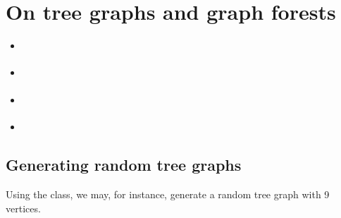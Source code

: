 \documentclass[a4paper,12pt,english]{sphinxhowto}
\begin{document}
\section{On tree graphs and graph forests}
\label{\detokenize{tutorial:on-tree-graphs-and-graph-forests}}\label{\detokenize{tutorial:trees-tutorial-label}}
\begin{sphinxShadowBox}
\begin{itemize}
\item {} 
\label{\detokenize{tutorial:id233}}{\hyperref[\detokenize{tutorial:generating-random-tree-graphs}]{}}

\item {} 
\label{\detokenize{tutorial:id234}}{\hyperref[\detokenize{tutorial:recognizing-tree-graphs}]{}}

\item {} 
\label{\detokenize{tutorial:id235}}{\hyperref[\detokenize{tutorial:spanning-trees-and-forests}]{}}

\item {} 
\label{\detokenize{tutorial:id236}}{\hyperref[\detokenize{tutorial:maximum-determined-spanning-forests}]{}}

\end{itemize}
\end{sphinxShadowBox}


\subsection{Generating random tree graphs}
\label{\detokenize{tutorial:generating-random-tree-graphs}}
Using the  class, we may, for instance, generate a random tree graph with 9 vertices.
\end{document}
